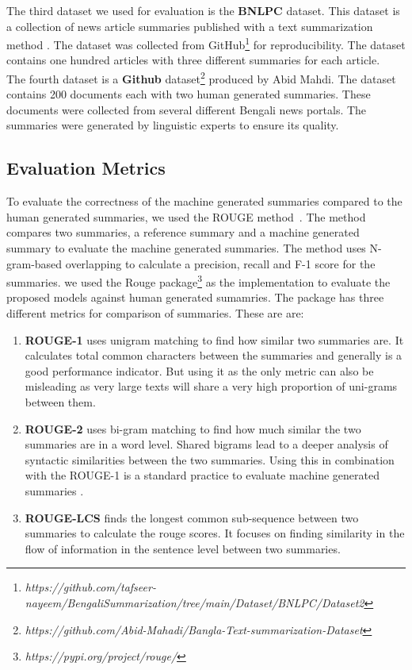 The third dataset we used for evaluation is the \textbf{BNLPC} \cite{Hque-2015-BNLPC-Dataset} dataset. This dataset is a collection of news article summaries published with a text summarization method \cite{Hque-2015-BNLPC-Dataset}. The dataset was collected from GitHub\footnote{\textit{https://github.com/tafseer-nayeem/BengaliSummarization/tree/main/Dataset/BNLPC/Dataset2}} for reproducibility. The dataset contains one hundred articles with three different summaries for each article.\\

The fourth dataset is a \textbf{Github} dataset\footnote{\textit{https://github.com/Abid-Mahadi/Bangla-Text-summarization-Dataset}} produced by Abid Mahdi. The dataset contains 200 documents each with two human generated summaries. These documents were collected from several different Bengali news portals. The summaries were generated by linguistic experts to ensure its quality.

\subsection{Evaluation Metrics}\label{subsec:evaluation-metrics}
To evaluate the correctness of the machine generated summaries compared to the human generated summaries, we used the ROUGE method~\cite{lin-2004-rouge}. The method compares two summaries, a reference summary and a machine generated summary to evaluate the machine generated summaries. The method uses N-gram-based overlapping to calculate a precision, recall and F-1 score for the summaries. we used the Rouge package\footnote{\textit{https://pypi.org/project/rouge/}} as the implementation to evaluate the proposed models against human generated sumamries. The package has three different metrics for comparison of summaries. These are are:

\begin{enumerate}
    \item \textbf{ROUGE-1} uses unigram matching to find how similar two summaries are. It calculates total common characters between the summaries and generally is a good performance indicator. But using it as the only metric can also be misleading as very large texts will share a very high proportion of uni-grams between them.
    \item \textbf{ROUGE-2} uses bi-gram matching to find how much similar the two summaries are in a word level. Shared bigrams lead to a deeper analysis of syntactic similarities between the two summaries. Using this in combination with the ROUGE-1 is a standard practice to evaluate machine generated summaries \cite{wafaa-2021-summary-comprehensive-review}.
    \item \textbf{ROUGE-LCS} finds the longest common sub-sequence between two summaries to calculate the rouge scores. It focuses on finding similarity in the flow of information in the sentence level between two summaries.
\end{enumerate}

